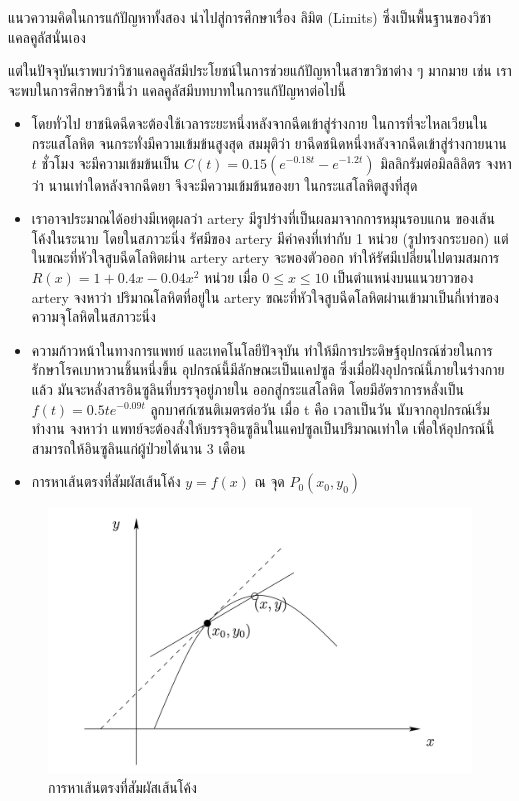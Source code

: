 \documentclass[
]{book}
\begin{document}
แนวความคิดในการแก้ปัญหาทั้งสอง นำไปสู่การศึกษาเรื่อง ลิมิต (Limits)
ซึ่งเป็นพื้นฐานของวิชาแคลคูลัสนั่นเอง

แต่ในปัจจุบันเราพบว่าวิชาแคลคูลัสมีประโยชน์ในการช่วยแก้ปัญหาในสาขาวิชาต่าง ๆ มากมาย เช่น
เราจะพบในการศึกษาวิชานี้ว่า แคลคูลัสมีบทบาทในการแก้ปัญหาต่อไปนี้

\begin{itemize}
\item
  โดยทั่วไป ยาชนิดฉีดจะต้องใช้เวลาระยะหนึ่งหลังจากฉีดเข้าสู่ร่างกาย
  ในการที่จะไหลเวียนในกระแสโลหิต จนกระทั่งมีความเข้มข้นสูงสุด สมมุติว่า
  ยาฉีดชนิดหนึ่งหลังจากฉีดเข้าสู่ร่างกายนาน \(t\) ชั่วโมง จะมีความเข้มข้นเป็น
  \(C(t) = 0.15(e^{-0.18t}-e^{-1.2t})\) มิลลิกรัมต่อมิลลิลิตร จงหาว่า
  นานเท่าใดหลังจากฉีดยา จึงจะมีความเข้มข้นของยา ในกระแสโลหิตสูงที่สุด
\item
  เราอาจประมาณได้อย่างมีเหตุผลว่า artery มีรูปร่างที่เป็นผลมาจากการหมุนรอบแกน
  ของเส้นโค้งในระนาบ โดยในสภาวะนิ่ง รัศมีของ artery มีค่าคงที่เท่ากับ 1 หน่วย
  (รูปทรงกระบอก) แต่ในขณะที่หัวใจสูบฉีดโลหิตผ่าน artery artery จะพองตัวออก
  ทำให้รัศมีเปลี่ยนไปตามสมการ \(R(x) = 1+0.4x-0.04x^{2}\) หน่วย เมื่อ
  \(0 \leq x\leq 10\) เป็นตำแหน่งบนแนวยาวของ artery จงหาว่า ปริมาณโลหิตที่อยู่ใน
  artery ขณะที่หัวใจสูบฉีดโลหิตผ่านเข้ามาเป็นกี่เท่าของความจุโลหิตในสภาวะนิ่ง
\item
  ความก้าวหน้าในทางการแพทย์ และเทคโนโลยีปัจจุบัน
  ทำให้มีการประดิษฐ์อุปกรณ์ช่วยในการรักษาโรคเบาหวานชิ้นหนึ่งขึ้น อุปกรณ์นี้มีลักษณะเป็นแคปซูล
  ซึ่งเมื่อฝังอุปกรณ์นี้ภายในร่างกายแล้ว มันจะหลั่งสารอินซูลินที่บรรจุอยู่ภายใน ออกสู่กระแสโลหิต
  โดยมีอัตราการหลั่งเป็น \(f\left( t\right) =0.5te^{-0.09t}\)
  ลูกบาศก์เซนติเมตรต่อวัน เมื่อ t คือ เวลาเป็นวัน นับจากอุปกรณ์เริ่มทำงาน จงหาว่า
  แพทย์จะต้องสั่งให้บรรจุอินซูลินในแคปซูลเป็นปริมาณเท่าใด
  เพื่อให้อุปกรณ์นี้สามารถให้อินซูลินแก่ผู้ป่วยได้นาน 3 เดือน
\item
  การหาเส้นตรงที่สัมผัสเส้นโค้ง \(y = f(x)\) ณ จุด \(P_{0}(x_{0},y_{0})\)
\end{itemize}

\begin{figure}

{\centering \includegraphics[width=0.5\linewidth]{images/fig-tangent-line} 

}

\caption{การหาเส้นตรงที่สัมผัสเส้นโค้ง}\label{fig:fig-tangent-line}
\end{figure}
\end{document}
